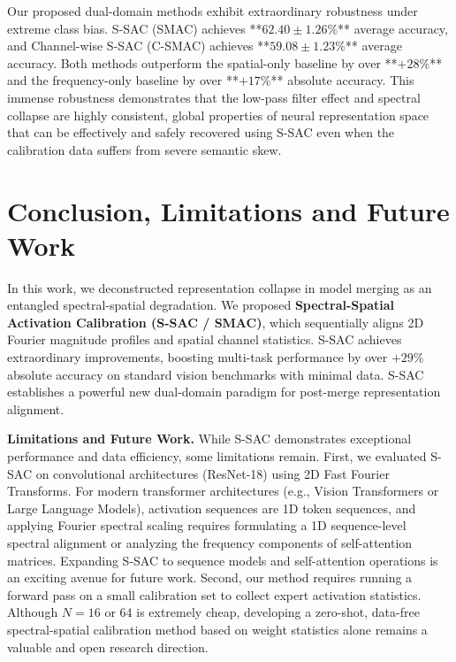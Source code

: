 \documentclass{article}
\theoremstyle{plain}
\theoremstyle{definition}
\theoremstyle{remark}
\begin{document}
Our proposed dual-domain methods exhibit extraordinary robustness under extreme class bias. S-SAC (SMAC) achieves **$62.40 \pm 1.26\%$** average accuracy, and Channel-wise S-SAC (C-SMAC) achieves **$59.08 \pm 1.23\%$** average accuracy. Both methods outperform the spatial-only baseline by over **$+28\%$** and the frequency-only baseline by over **$+17\%$** absolute accuracy. This immense robustness demonstrates that the low-pass filter effect and spectral collapse are highly consistent, global properties of neural representation space that can be effectively and safely recovered using S-SAC even when the calibration data suffers from severe semantic skew.

\section{Conclusion, Limitations and Future Work}
In this work, we deconstructed representation collapse in model merging as an entangled spectral-spatial degradation. We proposed \textbf{Spectral-Spatial Activation Calibration (S-SAC / SMAC)}, which sequentially aligns 2D Fourier magnitude profiles and spatial channel statistics. S-SAC achieves extraordinary improvements, boosting multi-task performance by over $+29\%$ absolute accuracy on standard vision benchmarks with minimal data. S-SAC establishes a powerful new dual-domain paradigm for post-merge representation alignment.

\textbf{Limitations and Future Work.} While S-SAC demonstrates exceptional performance and data efficiency, some limitations remain. First, we evaluated S-SAC on convolutional architectures (ResNet-18) using 2D Fast Fourier Transforms. For modern transformer architectures (e.g., Vision Transformers or Large Language Models), activation sequences are 1D token sequences, and applying Fourier spectral scaling requires formulating a 1D sequence-level spectral alignment or analyzing the frequency components of self-attention matrices. Expanding S-SAC to sequence models and self-attention operations is an exciting avenue for future work. Second, our method requires running a forward pass on a small calibration set to collect expert activation statistics. Although $N=16$ or $64$ is extremely cheap, developing a zero-shot, data-free spectral-spatial calibration method based on weight statistics alone remains a valuable and open research direction.



\end{document}
